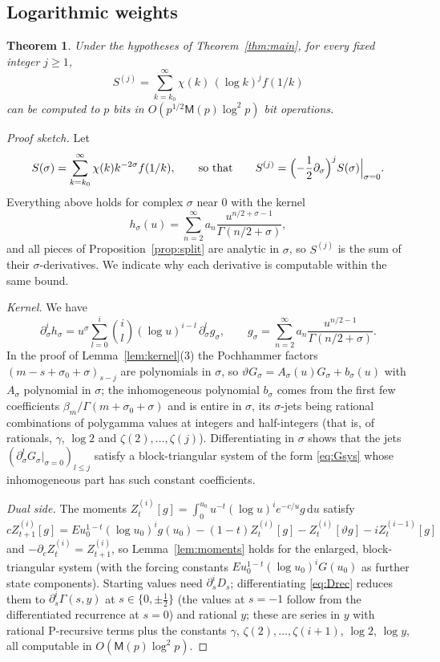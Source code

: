 \documentclass[11pt]{amsart}
\newtheorem{theorem}{Theorem}[section]
\theoremstyle{definition}
\theoremstyle{remark}
\newcommand{\dd}{\,\mathrm{d}}
\newcommand{\Mul}{\mathsf{M}}
\begin{document}
\subsection{Logarithmic weights}

\begin{theorem}\label{thm:log}
Under the hypotheses of Theorem~\ref{thm:main}, for every fixed integer $j \ge 1$,
\[
  S^{(j)} = \sum_{k=k_0}^{\infty}\chi(k)\,(\log k)^j f(1/k)
\]
can be computed to $p$ bits in $O(p^{1/2}\Mul(p)\log^2p)$ bit operations.
\end{theorem}

\begin{proof}[Proof sketch]
Let
\[
  S(\sigma) = \sum_{k=k_0}^{\infty} \chi(k) k^{-2\sigma} f(1/k), \qquad\text{so that}\qquad
  S^{(j)} = \Bigl(-\frac12\partial_\sigma\Bigr)^jS(\sigma)\Big|_{\sigma=0}.
\]
Everything above holds for complex $\sigma$ near $0$ with the kernel
\[
  h_\sigma(u) = \sum_{n=2}^{\infty} a_n \frac{u^{n/2+\sigma-1}}{\Gamma(n/2+\sigma)},
\]
and all pieces of Proposition~\ref{prop:split}
are analytic in $\sigma$, so $S^{(j)}$ is the sum of their $\sigma$-derivatives. We indicate why each derivative
is computable within the same bound.

\emph{Kernel.} We have
\[
  \partial_\sigma^i h_\sigma = u^\sigma\sum_{l=0}^{i}\binom il (\log u)^{i-l}\, \partial_\sigma^l g_\sigma, \qquad
  g_\sigma = \sum_{n=2}^{\infty} a_n \frac{u^{n/2-1}}{\Gamma(n/2+\sigma)}.
\]
In the proof of
Lemma~\ref{lem:kernel}(3) the Pochhammer factors $(m - s + \sigma_0 + \sigma)_{s-j}$ are polynomials in $\sigma$, so
$\vartheta G_\sigma = A_\sigma(u)G_\sigma + b_\sigma(u)$ with $A_\sigma$ polynomial in $\sigma$; the inhomogeneous polynomial $b_\sigma$
comes from the first few coefficients $\beta_m/\Gamma(m+\sigma_0+\sigma)$ and is entire in $\sigma$, its $\sigma$-jets being
rational combinations of polygamma values at integers and half-integers (that is, of rationals, $\gamma$, $\log2$ and
$\zeta(2), \dots, \zeta(j)$). Differentiating in $\sigma$ shows that the jets $(\partial_\sigma^lG_\sigma|_{\sigma=0})_{l\le j}$
satisfy a block-triangular system of the form \eqref{eq:Gsys} whose inhomogeneous part has such constant coefficients.

\emph{Dual side.} The moments $Z^{(i)}_t[g] = \int_0^{u_0}u^{-t}(\log u)^ie^{-c/u}g\dd u$ satisfy
\[
  c Z^{(i)}_{t+1}[g] = E u_0^{1-t}(\log u_0)^i g(u_0) - (1-t)Z^{(i)}_t[g] - Z^{(i)}_t[\vartheta g] - iZ^{(i-1)}_t[g]
\]
and $-\partial_c Z^{(i)}_t = Z^{(i)}_{t+1}$, so Lemma~\ref{lem:moments} holds for the enlarged, block-triangular
system (with the forcing constants $E u_0^{1-t}(\log u_0)^i G(u_0)$ as further state components). Starting values need
$\partial_s^iD_s$; differentiating \eqref{eq:Drec} reduces them to $\partial_s^i\Gamma(s, y)$ at $s \in \{0, \pm\frac12\}$
(the values at $s = -1$ follow from the differentiated recurrence at $s = 0$) and rational $y$; these are series in $y$ with rational
P-recursive terms plus the constants $\gamma$, $\zeta(2), \dots, \zeta(i+1)$, $\log 2$, $\log y$, all computable in
$O(\Mul(p)\log^2 p)$.


\end{proof}
\end{document}
